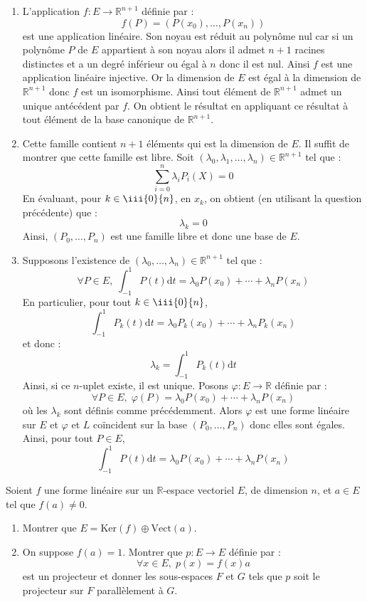 \documentclass[a4paper,twoside,french,11pt]{VcCours}
\newcommand{\dt}{\text{d}t}
\begin{document}
\begin{enumerate}
\item L'application $f : E \rightarrow \mathbb{R}^{n+1}$ définie par :
$$ f(P) = (P(x_0), \ldots, P(x_n))$$
est une application linéaire. Son noyau est réduit au polynôme nul car si un polynôme $P$ de $E$ appartient à son noyau alors il admet $n+1$ racines distinctes et a un degré inférieur ou égal à $n$ donc il est nul. Ainsi $f$ est une application linéaire injective. Or la dimension de $E$ est égal à la dimension de $\mathbb{R}^{n+1}$ donc $f$ est un isomorphisme. Ainsi tout élément de $\mathbb{R}^{n+1}$ admet un unique antécédent par $f$. On obtient le résultat en appliquant ce résultat à tout élément de la base canonique de $\mathbb{R}^{n+1}$.
\item Cette famille contient $n+1$ éléments qui est la dimension de $E$. Il suffit de montrer que cette famille est libre. Soit $(\lambda_0, \lambda_1, \ldots, \lambda_n) \in \mathbb{R}^{n+1}$ tel que :
$$ \sum_{i=0}^n \lambda_i P_i (X)= 0$$
En évaluant, pour $k \in \iii{0}{n}$, en $x_k$, on obtient (en utilisant la question précédente) que :
$$ \lambda_k =0$$
Ainsi, $(P_0, \ldots, P_n)$ est une famille libre et donc une base de $E$.
\item Supposons l'existence de $(\lambda_0, \ldots, \lambda_n) \in \mathbb{R}^{n+1}$ tel que :
$$ \forall P \in E, \; \int_{-1}^1 P(t) \dt = \lambda_0 P(x_0) + \cdots + \lambda_n P(x_n)$$
En particulier, pour tout $k \in \iii{0}{n}$,
$$ \int_{-1}^1 P_k(t) \dt = \lambda_0 P_k(x_0) + \cdots + \lambda_n P_k(x_n)$$
et donc :
$$ \lambda_k =  \int_{-1}^1 P_k(t) \dt$$
Ainsi, si ce $n$-uplet existe, il est unique. Posons $\varphi : E \rightarrow \mathbb{R}$ définie par :
$$  \forall P \in E, \;  \varphi(P)= \lambda_0 P(x_0) + \cdots + \lambda_n P(x_n)$$
où les $\lambda_k$ sont définis comme précédemment. Alors $\varphi$ est une forme linéaire sur $E$ et $\varphi$ et $L$ coïncident sur la base $(P_0, \ldots, P_n)$ donc elles sont égales. Ainsi, pour tout $P \in E$,
$$ \int_{-1}^1 P(t) \dt = \lambda_0 P(x_0) + \cdots + \lambda_n P(x_n)$$
\end{enumerate}



\begin{Exercice}{} Soient $f$ une forme linéaire sur un $\mathbb{R}$-espace vectoriel $E$, de dimension $n$, et $a\in E$ tel que $f(a)\neq 0$.
\begin{enumerate}
\item Montrer que $E=\textrm{Ker}(f)\oplus\textrm{Vect}(a)$.
\item On suppose $f(a)=1$. Montrer que $p : E \rightarrow E$ définie par :
$$ \forall x \in E, \; p(x) = f(x) a $$
est un projecteur et donner les sous-espaces $F$ et $G$ tels que $p$ soit le projecteur sur $F$ parallèlement à $G$.
\end{enumerate}
\end{Exercice}
\end{document}

